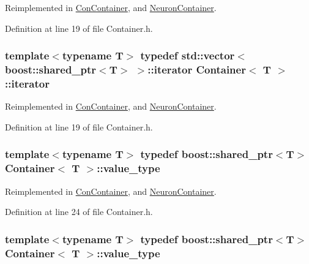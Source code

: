 Reimplemented in \hyperlink{class_con_container_a5dc8aab66a22fc25b7e700b51265b577}{ConContainer}, and \hyperlink{class_neuron_container_abf81356adaea3bfc64aa03777e9a8def}{NeuronContainer}.



Definition at line 19 of file Container.h.

\hypertarget{class_container_afe880028d8304353129f47cd1d28c20a}{
\subsubsection[{iterator}]{\setlength{\rightskip}{0pt plus 5cm}template$<$typename T$>$ typedef std::vector$<$boost::shared\_\-ptr$<$T$>$ $>$::{\bf iterator} {\bf Container}$<$ T $>$::{\bf iterator}}}
\label{class_container_afe880028d8304353129f47cd1d28c20a}


Reimplemented in \hyperlink{class_con_container_a5dc8aab66a22fc25b7e700b51265b577}{ConContainer}, and \hyperlink{class_neuron_container_abf81356adaea3bfc64aa03777e9a8def}{NeuronContainer}.



Definition at line 19 of file Container.h.

\hypertarget{class_container_aa44714b9a736d2cfd2e01a87ad1c001b}{
\subsubsection[{value\_\-type}]{\setlength{\rightskip}{0pt plus 5cm}template$<$typename T$>$ typedef boost::shared\_\-ptr$<$T$>$ {\bf Container}$<$ T $>$::{\bf value\_\-type}}}
\label{class_container_aa44714b9a736d2cfd2e01a87ad1c001b}


Reimplemented in \hyperlink{class_con_container_a08881a149e3a285eba67a4c8cff92a9e}{ConContainer}, and \hyperlink{class_neuron_container_ac067345f1d27a5b04e4d9487b319ccaa}{NeuronContainer}.



Definition at line 24 of file Container.h.

\hypertarget{class_container_aa44714b9a736d2cfd2e01a87ad1c001b}{
\subsubsection[{value\_\-type}]{\setlength{\rightskip}{0pt plus 5cm}template$<$typename T$>$ typedef boost::shared\_\-ptr$<$T$>$ {\bf Container}$<$ T $>$::{\bf value\_\-type}}}
\label{class_container_aa44714b9a736d2cfd2e01a87ad1c001b}


